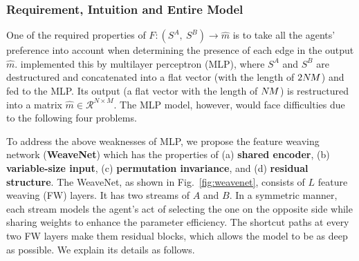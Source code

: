 \subsubsection{Requirement, Intuition and Entire Model}
One of the required properties of $F:(S^A,~S^B)\rightarrow \hat{m}$ is to take all the agents' preference into account when determining the presence of each edge in the output $\hat{m}$. 
\cite{harvard2019} implemented this by multilayer perceptron (MLP), %
where
$S^A$ and $S^B$ are destructured and concatenated into a flat vector (with the length of $2N\hspace{-0.1em}M$) and fed to the MLP. Its output (a flat vector with the length of $N\hspace{-0.1em}M$) is restructured into a matrix $\hat{m}\in {\mathcal R}^{N\times M}$.
The MLP model, however, would face difficulties due to the following four problems.


To address the above weaknesses of MLP, we propose the feature weaving network ({\bf WeaveNet}) which has the properties of (a) {\bf shared encoder}, (b) {\bf variable-size input}, (c) {\bf permutation invariance}, and (d) {\bf residual structure}. The WeaveNet, as shown in Fig.~\ref{fig:weavenet}, consists of $L$ feature weaving (FW) layers. It has two streams of $A$ and $B$. In a symmetric manner, each stream models the agent's act of selecting the one on the opposite side while sharing weights to enhance the parameter efficiency. The shortcut paths at every two FW layers make them residual blocks, which allows the model to be as deep as possible. We explain its details as follows.

